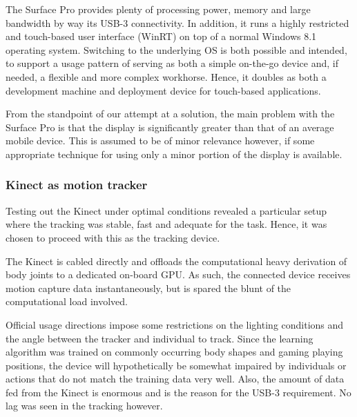 
The Surface Pro provides plenty of processing power, memory and large bandwidth by way its USB-3 connectivity. In addition, it runs a highly restricted and touch-based user interface (WinRT) on top of a normal Windows 8.1 operating system. Switching to the underlying OS is both possible and intended, to support a  usage pattern of serving as both a simple on-the-go device and, if needed, a flexible and more complex workhorse. Hence, it doubles as both a development machine and deployment device for touch-based applications.%


From the standpoint of our attempt at a solution, the main problem with the Surface Pro is that the display is significantly greater than that of an average mobile device. This is assumed to be of minor relevance however, if some appropriate technique for using only a minor portion of the display is available. 

\subsubsection{Kinect as motion tracker}

Testing out the Kinect under optimal conditions revealed a particular setup where the tracking was stable, fast and adequate for the task. Hence, it was chosen to proceed with this as the tracking device.




The Kinect is cabled directly  and offloads the computational heavy derivation of body joints to a dedicated on-board GPU. As such, the connected device receives motion capture data instantaneously, but is spared the blunt of the computational load involved. 


Official usage directions impose some restrictions on the lighting conditions and the angle between the tracker and individual to track. Since the learning algorithm was trained on commonly occurring body shapes and gaming playing positions, the device will hypothetically be somewhat impaired by individuals or actions that do not match the training data very well. Also, the amount of data fed from the Kinect is enormous and is the reason for the USB-3 requirement. No lag was seen in the tracking however.

